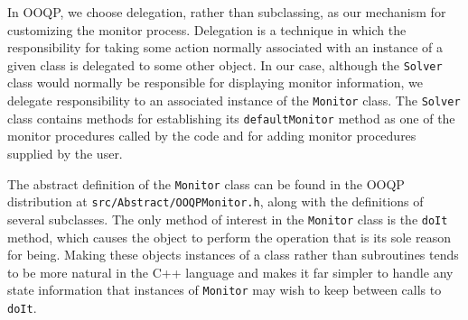 In OOQP, we choose delegation, rather than subclassing, as our
mechanism for customizing the monitor process. Delegation is a
technique in which the responsibility for taking some action normally
associated with an instance of a given class is delegated to some
other object. In our case, although the {\tt Solver} class would
normally be responsible for displaying monitor information, we
delegate responsibility to an associated instance of the
\texttt{Monitor} class. The {\tt Solver} class contains methods for
establishing its {\tt defaultMonitor} method as one of the monitor
procedures called by the code and for adding monitor
procedures supplied by the user.



The abstract definition of the {\tt Monitor} class can be found in the
OOQP distribution at {\tt src/Abstract/OOQPMonitor.h}, along with
the definitions of several subclasses. 
The only method of interest in the \texttt{Monitor} class is the
\texttt{doIt} method, which causes the object to perform the operation
that is its sole reason for being. Making these objects instances of a
class rather than subroutines tends to be more natural in the C++
language and makes it far simpler to handle any state information that
instances of \texttt{Monitor} may wish to keep between calls to
\texttt{doIt}.

